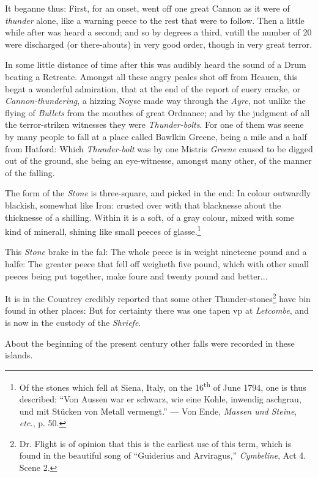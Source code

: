 \documentclass[a4paper, 12pt, oneside, polutonikogreek, english]{article}
\begin{document}
It beganne thus: First, for an onset, went off one great Cannon as it were of \emph{thunder} alone, like a warning peece to the rest that were to follow. Then a little while after was heard a second; and so by degrees a third, vntill the number of 20 were discharged (or there-abouts) in very good order, though in very great terror.

In some little distance of time after this was audibly heard the sound of a Drum beating a Retreate. Amongst all these angry peales shot off from Heauen, this begat a wonderful admiration, that at the end of the report of euery cracke, or \emph{Cannon-thundering}, a hizzing Noyse made way through the \emph{Ayre}, not unlike the flying of \emph{Bullets} from the mouthes of great Ordnance; and by the judgment of all the terror-striken witnesses they were \emph{Thunder-bolts}. For one of them was seene by many people to fall at a place called Bawlkin Greene, being a mile and a half from Hatford: Which \emph{Thunder-bolt} was by one Mistris \emph{Greene} caused to be digged out of the ground, she being an eye-witnesse, amongst many other, of the manner of the falling.

The form of the \emph{Stone} is three-square, and picked in the end: In colour outwardly blackish, somewhat like Iron: crusted over with that blacknesse about the thicknesse of a shilling. Within it is a soft, of a gray colour, mixed with some kind of minerall, shining like small peeces of glasse.\footnote{Of the stones which fell at Siena, Italy, on the 16\textsuperscript{th} of June 1794, one is thus described: ``Von Aussen war er schwarz, wie eine Kohle, inwendig aschgrau, und mit Stücken von Metall vermengt.'' --- Von Ende, \emph{Massen und Steine}, \emph{etc.}, p. 50.}

This \emph{Stone} brake in the fal: The whole peece is in weight nineteene pound and a halfe: The greater peece that fell off weigheth five pound, which with other small peeces being put together, make foure and twenty pound and better...

It is in the Countrey credibly reported that some other Thunder-stones\footnote{Dr. Flight is of opinion that this is the earliest use of this term, which is found in the beautiful song of ``Guiderius and Arviragus,'' \emph{Cymbeline}, Act 4. Scene 2.} have bin found in other places: But for certainty there was one tapen vp at \emph{Letcombe}, and is now in the custody of the \emph{Shriefe}.

About the beginning of the present century other falls were recorded in these islands.
\end{document}
